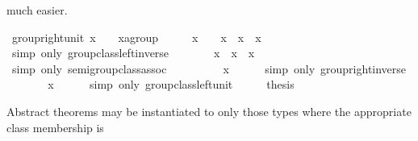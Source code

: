 \begin{isabellebody}
\begin{isamarkuptext}
  much easier.%
\end{isamarkuptext}%
\isamarkuptrue%
\isamarkupfalse%
\ group{\isacharunderscore}right{\isacharunderscore}unit{\isacharcolon}\ {\isachardoublequoteopen}x\ {\isasymodot}\ {\isasymone}\ {\isacharequal}\ {\isacharparenleft}x{\isasymColon}{\isacharprime}a{\isasymColon}group{\isacharparenright}{\isachardoublequoteclose}\isanewline
%
\isadelimproof
%
\endisadelimproof
%
\isatagproof
{}\isamarkupfalse%
\ {\isacharminus}\isanewline
\ \ \isamarkupfalse%
\ {\isachardoublequoteopen}x\ {\isasymodot}\ {\isasymone}\ {\isacharequal}\ x\ {\isasymodot}\ {\isacharparenleft}x{\isasyminv}\ {\isasymodot}\ x{\isacharparenright}{\isachardoublequoteclose}\isanewline
\ \ \ \ \isamarkupfalse%
\ {\isacharparenleft}simp\ only{\isacharcolon}\ group{\isacharunderscore}class{\isachardot}left{\isacharunderscore}inverse{\isacharparenright}\isanewline
\ \ \isamarkupfalse%
\ \isamarkupfalse%
\ {\isachardoublequoteopen}{\isachardot}{\isachardot}{\isachardot}\ {\isacharequal}\ x\ {\isasymodot}\ x{\isasyminv}\ {\isasymodot}\ x{\isachardoublequoteclose}\isanewline
\ \ \ \ \isamarkupfalse%
\ {\isacharparenleft}simp\ only{\isacharcolon}\ semigroup{\isacharunderscore}class{\isachardot}assoc{\isacharparenright}\isanewline
\ \ \isamarkupfalse%
\ \isamarkupfalse%
\ {\isachardoublequoteopen}{\isachardot}{\isachardot}{\isachardot}\ {\isacharequal}\ {\isasymone}\ {\isasymodot}\ x{\isachardoublequoteclose}\isanewline
\ \ \ \ \isamarkupfalse%
\ {\isacharparenleft}simp\ only{\isacharcolon}\ group{\isacharunderscore}right{\isacharunderscore}inverse{\isacharparenright}\isanewline
\ \ \isamarkupfalse%
\ \isamarkupfalse%
\ {\isachardoublequoteopen}{\isachardot}{\isachardot}{\isachardot}\ {\isacharequal}\ x{\isachardoublequoteclose}\isanewline
\ \ \ \ \isamarkupfalse%
\ {\isacharparenleft}simp\ only{\isacharcolon}\ group{\isacharunderscore}class{\isachardot}left{\isacharunderscore}unit{\isacharparenright}\isanewline
\ \ \isamarkupfalse%
\ \isamarkupfalse%
\ {\isacharquery}thesis\ \isacommand{{\isachardot}}\isamarkupfalse%
\isanewline
{}\isamarkupfalse%
%
\endisatagproof
{\isafoldproof}%
%
\isadelimproof
%
\endisadelimproof
%
\begin{isamarkuptext}%
\medskip Abstract theorems may be instantiated to only those types
  \isa{{\isasymtau}} where the appropriate class membership  is

\end{isamarkuptext}
\end{isabellebody}
